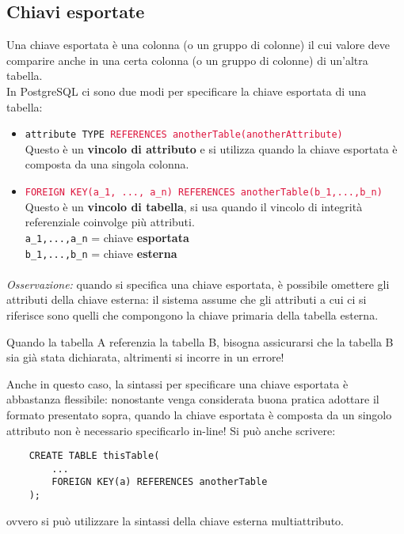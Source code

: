 \documentclass[12pt,a4paper]{book}
\begin{document}
	\subsection{Chiavi esportate}
	Una chiave esportata è una colonna (o un gruppo di colonne) il cui valore deve comparire anche in una certa colonna (o un gruppo di colonne) di un'altra tabella.\\
	In PostgreSQL ci sono due modi per specificare la chiave esportata di una tabella:
	\begin{itemize}
		\item \texttt{attribute TYPE \textcolor{crimson}{REFERENCES anotherTable(anotherAttribute)}}\\Questo è un \textbf{vincolo di attributo} e si utilizza quando la chiave esportata è composta da una singola colonna.
		\item \texttt{\textcolor{crimson}{FOREIGN KEY(a_1, ..., a_n) REFERENCES anotherTable(b_1,...,b_n)}}\\
		Questo è un \textbf{vincolo di tabella}, si usa quando il vincolo di integrità referenziale coinvolge più attributi.\\\texttt{a_1,...,a_n} = chiave \textbf{esportata}\\ \texttt{b_1,...,b_n} = chiave \textbf{esterna} 
	\end{itemize}
	\paragraph{}\textit{Osservazione:} quando si specifica una chiave esportata, è possibile omettere gli attributi della chiave esterna: il sistema assume che gli attributi a cui ci si riferisce sono quelli che compongono la chiave primaria della tabella esterna.\\
	\begin{tcolorbox}[enhanced jigsaw, breakable, title=Attenzione, colframe=red!70!black]
	Quando la tabella A referenzia la tabella B, bisogna assicurarsi che la tabella B sia già stata dichiarata, altrimenti si incorre in un errore!
	\end{tcolorbox}
	Anche in questo caso, la sintassi per specificare una chiave esportata è abbastanza flessibile: nonostante venga considerata buona pratica adottare il formato presentato sopra, quando la chiave esportata è composta da un singolo attributo non è necessario specificarlo in-line!
	Si può anche scrivere:
	\begin{lstlisting}
	CREATE TABLE thisTable(
		...
		FOREIGN KEY(a) REFERENCES anotherTable
	);
	\end{lstlisting}
	ovvero si può utilizzare la sintassi della chiave esterna multiattributo.
\end{document}
